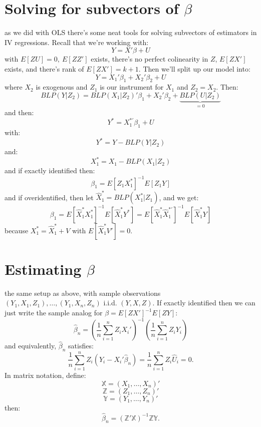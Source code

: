 \documentclass{tufte-book}
\theoremstyle{mytheoremstyle}
\theoremstyle{mylemstyle}
\theoremstyle{mydefstyle}
\begin{document}
\section{Solving for subvectors of \(\beta\)}
 as we did with OLS there's some neat tools for solving subvectors of estimators in IV regressions. Recall that we're working with:
	\[Y = X'\beta + U\]
with \(E[ZU] = 0,\ E[ZZ']\) exists, there's no perfect colinearity in \(Z\), \(E[ZX']\) exists, and there's rank of \(E[ZX'] = k+1\). Then we'll split up our model into:
	\[Y = X_1'\beta_1 + X_2'\beta_2 + U\]
where \(X_2\) is exogenous and \(Z_1\) is our instrument for \(X_1\) and \(Z_2 = X_2\). Then:
	\[BLP(Y|Z_2) = BLP(X_1|Z_2)'\beta_1 + X_2'\beta_2 + \underbrace{BLP(U|Z_2)}_\textrm{\(=0\)}\]
and then:
	\[Y^* = X_1^{*'}\beta_1 + U\]
with:
	\[Y^* = Y - BLP(Y|Z_2)\]
and:
	\[X_1^* = X_1 - BLP(X_1 | Z_2)\]
and if exactly identified then:
	\[\beta_1 = E[Z_1X^*_1]^{-1}E[Z_1 Y]\]
and if overidentified, then let \(\hat{X}_1^* = BLP(X_1^*|Z_1)\), and we get:
	\[\beta_1 = E[\hat{X}_1^*X_1^*]^{-1}E[\hat{X}_1^* Y^*] = E[\hat{X}_1^*\hat{X}_1^{*'}]^{-1}E[\hat{X}_1^* Y]\]
because \(X_1^* = \hat{X}_1^* + V\) with \(E[\hat{X}_1^* V'] = 0\). 

\section{Estimating \(\beta\)}
 the same setup as above, with sample observations \((Y_1, X_1, Z_1), \dots, (Y_1, X_n, Z_n)\) i.i.d. \((Y, X, Z)\). If exactly identified then we can just write the sample analog for \(\beta = E[ZX']^{-1}E[ZY]\):
	\[\hat{\beta}_n = \left(\frac{1}{n}\sum_{i=1}^n Z_i X_i'\right)^{-1} \left(\frac{1}{n} \sum_{i=1}^n Z_i Y_i\right)\]
and equivalently, \(\hat{\beta}_n\) satisfies:
	\[\frac{1}{n}\sum_{i=1}^n Z_i (Y_i - X_i'\hat{\beta}_n) = \frac{1}{n}\sum_{i=1}^n Z_i \hat{U}_i = 0 \text{.}\]
In matrix notation, define:
	\[\mathbb{X} = (X_1, \dots, X_n)'\]
	\[\mathbb{Z} = (Z_1, \dots, Z_n)'\]
	\[\mathbb{Y} = (Y_1, \dots, Y_n)'\]
then:
	\[\hat{\beta}_n = (\mathbb{Z}'\mathbb{X})^{-1}\mathbb{Z}\mathbb{Y} \text{.}\]
\end{document}
